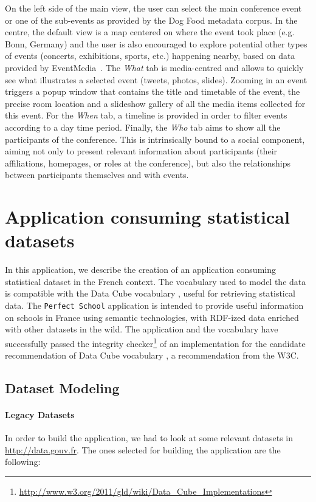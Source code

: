 On the left side of the main view, the user can select the main conference event or one of the sub-events as provided by the Dog Food metadata corpus. In the centre, the default view is a map centered on where the event took place (e.g. Bonn, Germany) and the user is also encouraged to explore potential other types of events (concerts, exhibitions, sports, etc.) happening nearby, based on data provided by EventMedia~\cite{Troncy:ISEMANTICS10}. The \textit{What} tab is media-centred and allows to quickly see what illustrates a selected event (tweets, photos, slides). Zooming in an event triggers a popup window that contains the title and timetable of the event, the precise room location and a slideshow gallery of all the media items collected for this event. For the \textit{When} tab, a timeline is provided in order to filter events according to a day time period. Finally, the \textit{Who} tab aims to show all the participants of the conference. This is intrinsically bound to a social component, aiming not only to present relevant information about participants (their affiliations, homepages, or roles at the conference), but also the relationships between participants themselves and with events.


\section{Application consuming statistical datasets}
\label{sec:perfectSchool}

In this application, we describe the creation of an application consuming statistical dataset in the French context. The vocabulary used to model the data is compatible with the Data Cube vocabulary \cite{dcube}, useful for retrieving statistical data.
The \texttt{Perfect School} application is intended to provide useful information on schools in France using semantic technologies, with RDF-ized data enriched with other datasets in the wild. The application and the vocabulary have successfully passed the integrity checker\footnote{\url{http://www.w3.org/2011/gld/wiki/Data_Cube_Implementations}} of an implementation for the candidate recommendation of Data Cube vocabulary \cite{dcube}, a recommendation from the W3C.

\subsection{Dataset Modeling}

\paragraph{Legacy Datasets}
In order to build the application, we had to look at some relevant datasets in \url{http://data.gouv.fr}. The ones selected for building the application are the following:

